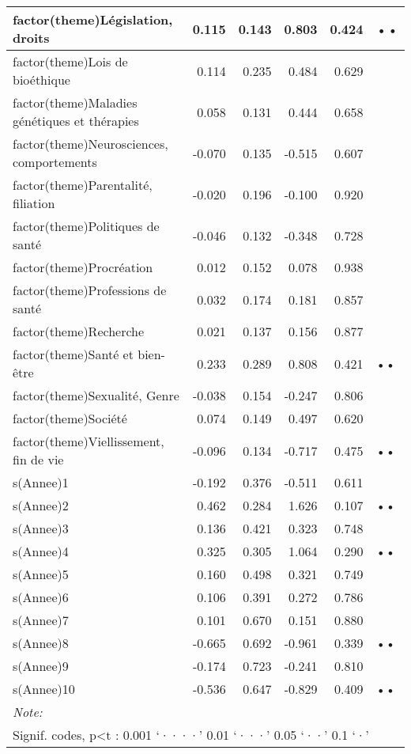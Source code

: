 \documentclass[
  letterpaper,
  DIV=11,
  numbers=noendperiod]{scrartcl}
\begin{document}
\begin{table}
\begin{minipage}[t]{\linewidth}
{\begin{tabular}[t]{l|r|r|r|r|l}
\hline
factor(theme)Législation, droits & 0.115 & 0.143 & 0.803 & 0.424 & ••\\
\hline
factor(theme)Lois de bioéthique & 0.114 & 0.235 & 0.484 & 0.629 & \\
\hline
factor(theme)Maladies génétiques et thérapies & 0.058 & 0.131 & 0.444 & 0.658 & \\
\hline
factor(theme)Neurosciences, comportements & -0.070 & 0.135 & -0.515 & 0.607 & \\
\hline
factor(theme)Parentalité, filiation & -0.020 & 0.196 & -0.100 & 0.920 & \\
\hline
factor(theme)Politiques de santé & -0.046 & 0.132 & -0.348 & 0.728 & \\
\hline
factor(theme)Procréation & 0.012 & 0.152 & 0.078 & 0.938 & \\
\hline
factor(theme)Professions de santé & 0.032 & 0.174 & 0.181 & 0.857 & \\
\hline
factor(theme)Recherche & 0.021 & 0.137 & 0.156 & 0.877 & \\
\hline
factor(theme)Santé et bien-être & 0.233 & 0.289 & 0.808 & 0.421 & ••\\
\hline
factor(theme)Sexualité, Genre & -0.038 & 0.154 & -0.247 & 0.806 & \\
\hline
factor(theme)Société & 0.074 & 0.149 & 0.497 & 0.620 & \\
\hline
factor(theme)Viellissement, fin de vie & -0.096 & 0.134 & -0.717 & 0.475 & ••\\
\hline
s(Annee)1 & -0.192 & 0.376 & -0.511 & 0.611 & \\
\hline
s(Annee)2 & 0.462 & 0.284 & 1.626 & 0.107 & ••\\
\hline
s(Annee)3 & 0.136 & 0.421 & 0.323 & 0.748 & \\
\hline
s(Annee)4 & 0.325 & 0.305 & 1.064 & 0.290 & ••\\
\hline
s(Annee)5 & 0.160 & 0.498 & 0.321 & 0.749 & \\
\hline
s(Annee)6 & 0.106 & 0.391 & 0.272 & 0.786 & \\
\hline
s(Annee)7 & 0.101 & 0.670 & 0.151 & 0.880 & \\
\hline
s(Annee)8 & -0.665 & 0.692 & -0.961 & 0.339 & ••\\
\hline
s(Annee)9 & -0.174 & 0.723 & -0.241 & 0.810 & \\
\hline
s(Annee)10 & -0.536 & 0.647 & -0.829 & 0.409 & ••\\
\hline
\multicolumn{6}{l}{\rule{0pt}{1em}\textit{Note: }}\\
\multicolumn{6}{l}{\rule{0pt}{1em}Signif. codes, p<t : 0.001 ‘····’ 0.01 ‘···’ 0.05 ‘··’ 0.1 ‘·’ }\\
\end{tabular}

}
\end{minipage}
\end{table}
\end{document}
